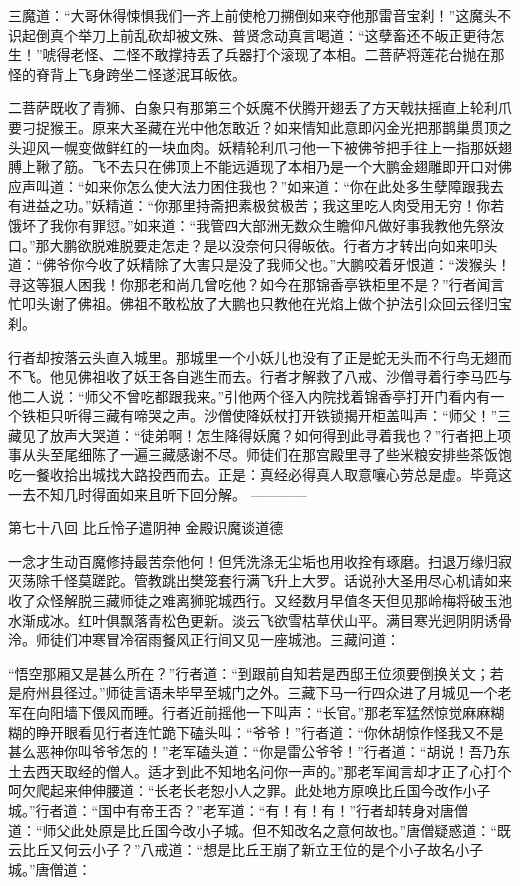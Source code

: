 \documentclass[12pt,UTF8]{ctexbook}
\begin{document}
{	三魔道：“大哥休得悚惧我们一齐上前使枪刀搠倒如来夺他那雷音宝刹！”这魔头不识起倒真个举刀上前乱砍却被文殊、普贤念动真言喝道：“这孽畜还不皈正更待怎生！”唬得老怪、二怪不敢撑持丢了兵器打个滚现了本相。二菩萨将莲花台抛在那怪的脊背上飞身跨坐二怪遂泯耳皈依。
	
	二菩萨既收了青狮、白象只有那第三个妖魔不伏腾开翅丢了方天戟扶摇直上轮利爪要刁捉猴王。原来大圣藏在光中他怎敢近？如来情知此意即闪金光把那鹊巢贯顶之头迎风一幌变做鲜红的一块血肉。妖精轮利爪刁他一下被佛爷把手往上一指那妖翅膊上鞦了筋。飞不去只在佛顶上不能远遁现了本相乃是一个大鹏金翅雕即开口对佛应声叫道：“如来你怎么使大法力困住我也？”如来道：“你在此处多生孽障跟我去有进益之功。”妖精道：“你那里持斋把素极贫极苦；我这里吃人肉受用无穷！你若饿坏了我你有罪愆。”如来道：“我管四大部洲无数众生瞻仰凡做好事我教他先祭汝口。”那大鹏欲脱难脱要走怎走？是以没奈何只得皈依。行者方才转出向如来叩头道：“佛爷你今收了妖精除了大害只是没了我师父也。”大鹏咬着牙恨道：“泼猴头！寻这等狠人困我！你那老和尚几曾吃他？如今在那锦香亭铁柜里不是？”行者闻言忙叩头谢了佛祖。佛祖不敢松放了大鹏也只教他在光焰上做个护法引众回云径归宝刹。
	
	行者却按落云头直入城里。那城里一个小妖儿也没有了正是蛇无头而不行鸟无翅而不飞。他见佛祖收了妖王各自逃生而去。行者才解救了八戒、沙僧寻着行李马匹与他二人说：“师父不曾吃都跟我来。”引他两个径入内院找着锦香亭打开门看内有一个铁柜只听得三藏有啼哭之声。沙僧使降妖杖打开铁锁揭开柜盖叫声：“师父！”三藏见了放声大哭道：“徒弟啊！怎生降得妖魔？如何得到此寻着我也？”行者把上项事从头至尾细陈了一遍三藏感谢不尽。师徒们在那宫殿里寻了些米粮安排些茶饭饱吃一餐收拾出城找大路投西而去。正是：真经必得真人取意嚷心劳总是虚。毕竟这一去不知几时得面如来且听下回分解。
	------------
	
	第七十八回 比丘怜子遣阴神 金殿识魔谈道德
	
	一念才生动百魔修持最苦奈他何！但凭洗涤无尘垢也用收拴有琢磨。扫退万缘归寂灭荡除千怪莫蹉跎。管教跳出樊笼套行满飞升上大罗。话说孙大圣用尽心机请如来收了众怪解脱三藏师徒之难离狮驼城西行。又经数月早值冬天但见那岭梅将破玉池水渐成冰。红叶俱飘落青松色更新。淡云飞欲雪枯草伏山平。满目寒光迥阴阴诱骨泠。师徒们冲寒冒冷宿雨餐风正行间又见一座城池。三藏问道：
	
	“悟空那厢又是甚么所在？”行者道：“到跟前自知若是西邸王位须要倒换关文；若是府州县径过。”师徒言语未毕早至城门之外。三藏下马一行四众进了月城见一个老军在向阳墙下偎风而睡。行者近前摇他一下叫声：“长官。”那老军猛然惊觉麻麻糊糊的睁开眼看见行者连忙跪下磕头叫：“爷爷！”行者道：“你休胡惊作怪我又不是甚么恶神你叫爷爷怎的！”老军磕头道：“你是雷公爷爷！”行者道：“胡说！吾乃东土去西天取经的僧人。适才到此不知地名问你一声的。”那老军闻言却才正了心打个呵欠爬起来伸伸腰道：“长老长老恕小人之罪。此处地方原唤比丘国今改作小子城。”行者道：“国中有帝王否？”老军道：“有！有！有！”行者却转身对唐僧道：“师父此处原是比丘国今改小子城。但不知改名之意何故也。”唐僧疑惑道：“既云比丘又何云小子？”八戒道：“想是比丘王崩了新立王位的是个小子故名小子城。”唐僧道：
	
}
\end{document}
